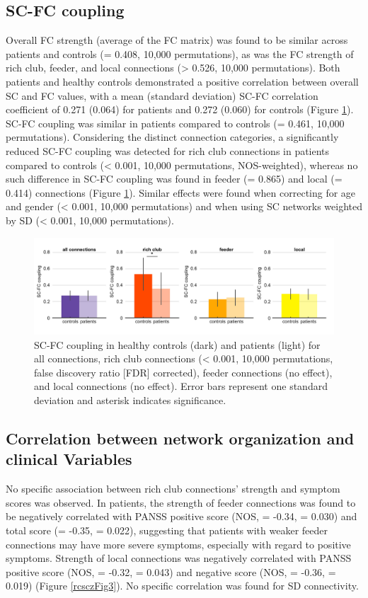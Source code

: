 \begin{refsection}
\subsection*{SC-FC coupling}
Overall FC strength (average of the FC matrix) was found to be similar across patients and controls (\pval = 0.408, 10,000 permutations), as was the FC strength of rich club, feeder, and local connections (\pval > 0.526, 10,000 permutations). Both patients and healthy controls demonstrated a positive correlation between overall SC and FC values, with a mean (standard deviation) SC-FC correlation coefficient of 0.271 (0.064) for patients and 0.272 (0.060) for controls (Figure \ref{rcsczFig2}). SC-FC coupling was similar in patients compared to controls (\pval = 0.461, 10,000 permutations). Considering the distinct connection categories, a significantly reduced SC-FC coupling was detected for rich club connections in patients compared to controls (\pval < 0.001, 10,000 permutations, NOS-weighted), whereas no such difference in SC-FC coupling was found in feeder (\pval = 0.865) and local (\pval = 0.414) connections (Figure \ref{rcsczFig2}). Similar effects were found when correcting for age and gender (\pval < 0.001, 10,000 permutations) and when using SC networks weighted by SD (\pval < 0.001, 10,000 permutations).

\begin{figure}[h]
\centering
  \includegraphics[width=\linewidth]{images/rcsczFig2.jpg}
  \caption{\small SC-FC coupling in healthy controls (dark) and patients (light) for all connections, rich club connections (\pval < 0.001, 10,000 permutations, false discovery ratio [FDR] corrected), feeder connections (no effect), and local connections (no effect). Error bars represent one standard deviation and asterisk indicates significance.}
  \label{rcsczFig2}
\end{figure}

\subsection*{Correlation between network organization and clinical Variables}
No specific association between rich club connections' strength and symptom scores was observed. In patients, the strength of feeder connections was found to be negatively correlated with PANSS positive score (NOS, \rval = -0.34, \pval = 0.030) and total score (\rval = -0.35, \pval = 0.022), suggesting that patients with weaker feeder connections may have more severe symptoms, especially with regard to positive symptoms. Strength of local connections was negatively correlated with PANSS positive score (NOS, \rval = -0.32, \pval = 0.043) and negative score (NOS, \rval = -0.36, \pval = 0.019) (Figure \ref{rcsczFig3}). No specific correlation was found for SD connectivity.


\end{refsection}
